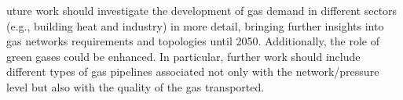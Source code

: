 uture work should investigate the development of gas demand in different sectors (e.g., building heat and industry) in more detail, bringing further insights into gas networks requirements and topologies until 2050. Additionally, the role of green gases could be enhanced. In particular, further work should include different types of gas pipelines associated not only with the network/pressure level but also with the quality of the gas transported.